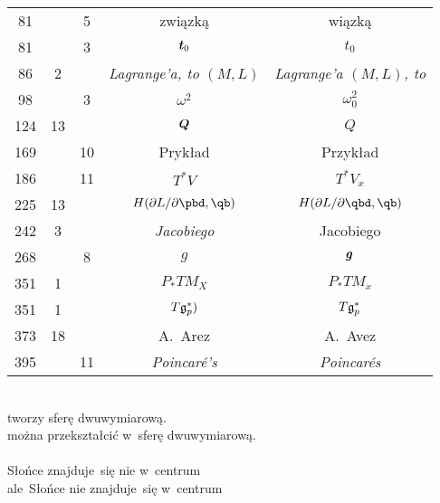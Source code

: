 \documentclass[a4paper,11pt]{article}
\begin{document}
\begin{center}
\begin{tabular}{|c|c|c|c|c|}
    81  & &  5 & związką & wiązką \\
    81  & &  3 & $\boldsymbol{t}_{ 0 }$ & $t_{ 0 }$ \\
    86  &  2 & & \emph{Lagrange'a, to $( M, L )$}
           & \emph{Lagrange'a $( M, L )$, to} \\
    98  & &  3 & $\omega^{ 2 }$ & $\omega_{ 0 }^{ 2 }$ \\
    124 & 13 & & $\boldsymbol{Q}$ & $Q$ \\
    169 & & 10 & Prykład & Przykład \\
    186 & & 11 & $T^{ * }V$ & $T^{ * }V_{ x }$ \\
    225 & 13 & & $H( \pr L / \pr \pbd, \qb )$
           & $H( \pr L / \pr \qbd, \qb )$ \\
    242 & 3 & & \emph{Jacobiego} & Jacobiego \\
    268 & &  8 & $g$ & $\boldsymbol{g}$ \\
    351 &  1 & & $P_{ * }TM_{ X }$ & $P_{ * }TM_{ x }$ \\
    351 &  1 & & $T\mathfrak{g}_{ p }^{ * })$ & $T\mathfrak{g}_{ p }^{ * }$ \\
    373 & 18 & & A.~Arez & A.~Avez \\
    395 & & 11 & \emph{Poincar\'{e}'s} & \emph{Poincar\'{e}s} \\
    \hline
  \end{tabular}
\end{center}
\noi
{} \\
\Jest tworzy sferę dwuwymiarową. \\
\Pow   można przekształcić w~sferę dwuwymiarową. \\
 \\
\Jest Słońce znajduje~się nie w~centrum \\
\Pow  ale~Słońce nie znajduje~się w~centrum \\

\vspace{\spaceTwo}









\end{document}
